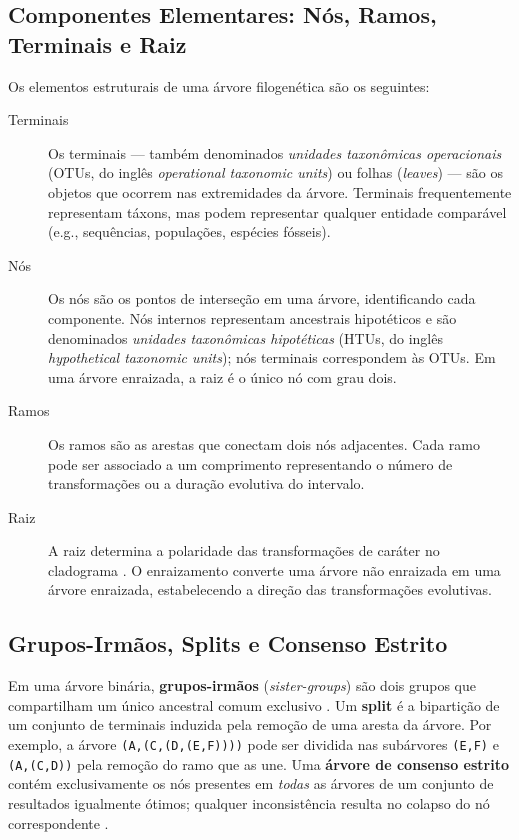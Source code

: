 \subsection{Componentes Elementares: Nós, Ramos, Terminais e Raiz}

Os elementos estruturais de uma árvore filogenética são os seguintes:

\begin{description}
    \item[Terminais] Os terminais --- também denominados \textit{unidades taxonômicas operacionais} (OTUs, do inglês \textit{operational taxonomic units}) ou folhas (\textit{leaves}) --- são os objetos que ocorrem nas extremidades da árvore. Terminais frequentemente representam táxons, mas podem representar qualquer entidade comparável (e.g., sequências, populações, espécies fósseis).

    \item[Nós] Os nós são os pontos de interseção em uma árvore, identificando cada componente. Nós internos representam ancestrais hipotéticos e são denominados \textit{unidades taxonômicas hipotéticas} (HTUs, do inglês \textit{hypothetical taxonomic units}); nós terminais correspondem às OTUs. Em uma árvore enraizada, a raiz é o único nó com grau dois.

    \item[Ramos] Os ramos são as arestas que conectam dois nós adjacentes. Cada ramo pode ser associado a um comprimento representando o número de transformações ou a duração evolutiva do intervalo.

    \item[Raiz] A raiz determina a polaridade das transformações de caráter no cladograma \parencite{schuh2009}. O enraizamento converte uma árvore não enraizada em uma árvore enraizada, estabelecendo a direção das transformações evolutivas.
\end{description}

\subsection{Grupos-Irmãos, Splits e Consenso Estrito}

Em uma árvore binária, \textbf{grupos-irmãos} (\textit{sister-groups}) são dois grupos que compartilham um único ancestral comum exclusivo \parencite{schuh2009}. Um \textbf{split} é a bipartição de um conjunto de terminais induzida pela remoção de uma aresta da árvore. Por exemplo, a árvore \texttt{(A,(C,(D,(E,F))))} pode ser dividida nas subárvores \texttt{(E,F)} e \texttt{(A,(C,D))} pela remoção do ramo que as une. Uma \textbf{árvore de consenso estrito} contém exclusivamente os nós presentes em \emph{todas} as árvores de um conjunto de resultados igualmente ótimos; qualquer inconsistência resulta no colapso do nó correspondente \parencite{schuh2009}.

